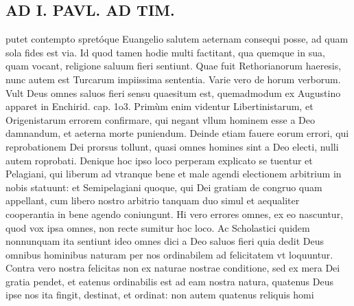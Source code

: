 \documentclass{article}
\begin{document}
\begin{pages}
\section*{AD I. PAVL. AD TIM. }
\marginpar{[ p.54 ]}\pstart putet contempto spretóque Euangelio salutem aeternam consequi posse, ad quam sola fides est via. Id quod tamen hodie multi factitant, qua quemque in sua, quam vocant, religione saluum fieri sentiunt. Quae fuit Rethorianorum haeresis, nunc autem est Turcarum impiissima sententia.  \pend\pstart Varie vero de horum verborum. Vult Deus omnes saluos fieri sensu quaesitum est, quemadmodum ex Augustino apparet in Enchirid. cap. 1o3. Primùm enim videntur Libertinistarum, et Origenistarum errorem confirmare, qui negant vllum hominem esse a Deo damnandum, et aeterna morte puniendum. Deinde etiam fauere eorum errori, qui reprobationem Dei prorsus tollunt, quasi omnes homines sint a Deo electi, nulli autem roprobati. Denique hoc ipso loco perperam explicato se tuentur et Pelagiani, qui liberum ad vtranque bene et male agendi electionem arbitrium in nobis statuunt: et Semipelagiani quoque, qui Dei gratiam de congruo quam appellant, cum libero nostro arbitrio tanquam duo simul et aequaliter cooperantia in bene agendo coniungunt. Hi vero errores omnes, ex eo nascuntur, quod vox ipsa omnes, non recte sumitur hoc loco. Ac Scholastici quidem nonnunquam ita sentiunt ideo omnes dici a Deo saluos fieri quia dedit Deus omnibus hominibus naturam per nos ordinabilem ad felicitatem vt loquuntur. Contra vero nostra felicitas non ex naturae nostrae conditione, sed ex mera Dei gratia pendet, et eatenus ordinabilis est ad eam nostra natura, quatenus Deus ipse nos ita fingit, destinat, et ordinat: non autem quatenus reliquis homi\pend

\end{pages}
\end{document}
